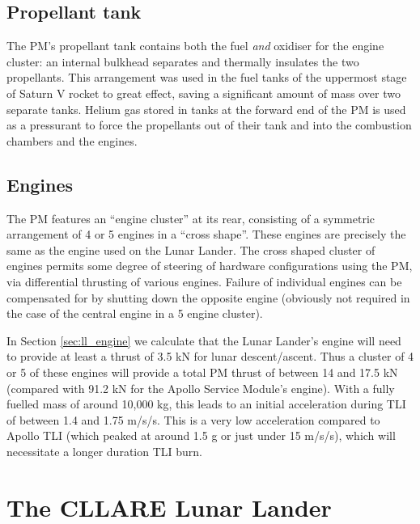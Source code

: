 \documentclass{report}
\begin{document}
\subsection{Propellant tank}

The PM's propellant tank contains both the fuel \emph{and} oxidiser for the engine cluster: an internal bulkhead separates and thermally insulates the two propellants.  This arrangement was used in the fuel tanks of the uppermost stage of Saturn V rocket to great effect, saving a significant amount of mass over two separate tanks.  Helium gas stored in tanks at the forward end of the PM is used as a pressurant to force the propellants out of their tank and into the combustion chambers and the engines.

\subsection{Engines}

The PM features an ``engine cluster'' at its rear, consisting of a symmetric arrangement of 4 or 5 engines in a ``cross shape''.  These engines are precisely the same as the engine used on the Lunar Lander.  The cross shaped cluster of engines permits some degree of steering of hardware configurations using the PM, via differential thrusting of various engines.  Failure of individual engines can be compensated for by shutting down the opposite engine (obviously not required in the case of the central engine in a 5 engine cluster).

In Section \ref{sec:ll_engine} we calculate that the Lunar Lander's engine will need to provide at least a thrust of 3.5 kN for lunar descent/ascent.  Thus a cluster of 4 or 5 of these engines will provide a total PM thrust of between 14 and 17.5 kN (compared with 91.2 kN for the Apollo Service Module's engine).  With a fully fuelled mass of around 10,000 kg, this leads to an initial acceleration during TLI of between 1.4 and 1.75 m/s/s.  This is a very low acceleration compared to Apollo TLI (which peaked at around 1.5 g or just under 15 m/s/s), which will necessitate a longer duration TLI burn.


\section{The CLLARE Lunar Lander}
\end{document}
